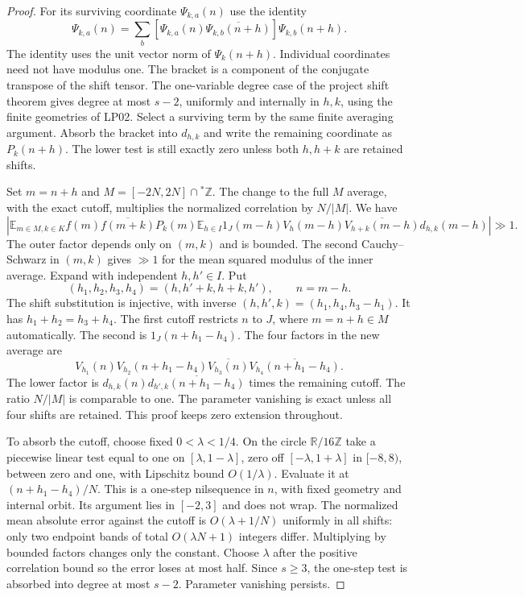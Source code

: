\documentclass[11pt]{article}
\newcommand{\E}{\mathbb E}
\newcommand{\Z}{\mathbb Z}
\begin{document}
\begin{proof}
For its surviving coordinate $\Psi_{k,a}(n)$ use the identity
\[
 \Psi_{k,a}(n)=\sum_b
 [\Psi_{k,a}(n)\overline{\Psi_{k,b}(n+h)}]\Psi_{k,b}(n+h).
\]
The identity uses the unit vector norm of $\Psi_k(n+h)$.
Individual coordinates need not have modulus one. The bracket
is a component of the conjugate transpose of the shift tensor.
The one-variable degree case of the project shift theorem gives
degree at most $s-2$, uniformly and internally in $h,k$, using the
finite geometries of LP02. Select a surviving term by the same
finite averaging argument. Absorb the bracket into $d_{h,k}$ and
write the remaining coordinate as $P_k(n+h)$. The lower test is
still exactly zero unless both $h,h+k$ are retained shifts.

Set $m=n+h$ and $M=[-2N,2N]\cap{}^*\Z$. The change to the
full $M$ average, with the exact cutoff, multiplies the
normalized correlation by $N/|M|$. We have
\[
 \left|\E_{m\in M,k\in K}
 f(m)\overline{f(m+k)}P_k(m)
 \E_{h\in I} 1_J(m-h)V_h(m-h)
 \overline{V_{h+k}(m-h)}d_{h,k}(m-h)\right|\gg1 .
\]
The outer factor depends only on $(m,k)$ and is bounded.
The second Cauchy--Schwarz in $(m,k)$ gives $\gg1$ for the
mean squared modulus of the inner average. Expand with independent
$h,h'\in I$. Put
\[
 (h_1,h_2,h_3,h_4)=(h,h'+k,h+k,h'),\qquad n=m-h.
\]
The shift substitution is injective, with inverse
$(h,h',k)=(h_1,h_4,h_3-h_1)$. It has $h_1+h_2=h_3+h_4$.
The first cutoff restricts $n$ to $J$, where $m=n+h\in M$
automatically. The second is $1_J(n+h_1-h_4)$. The four factors
in the new average are
\[
 V_{h_1}(n)V_{h_2}(n+h_1-h_4)
 \overline{V_{h_3}(n)}\overline{V_{h_4}(n+h_1-h_4)} .
\]
The lower factor is
$d_{h,k}(n)\overline{d_{h',k}(n+h_1-h_4)}$
times the remaining cutoff. The ratio $N/|M|$ is comparable
to one. The parameter vanishing is exact unless all four shifts
are retained. This proof keeps zero extension throughout.

To absorb the cutoff, choose fixed $0<\lambda<1/4$.
On the circle $\mathbb R/16\Z$ take a piecewise linear test
equal to one on $[\lambda,1-\lambda]$, zero off
$[-\lambda,1+\lambda]$ in $[-8,8)$, between zero and one,
with Lipschitz bound $O(1/\lambda)$. Evaluate it at
$(n+h_1-h_4)/N$. This is a one-step nilsequence in $n$,
with fixed geometry and internal orbit. Its argument lies in
$[-2,3]$ and does not wrap. The normalized mean absolute error
against the cutoff is $O(\lambda+1/N)$ uniformly in all shifts:
only two endpoint bands of total $O(\lambda N+1)$ integers
differ. Multiplying by bounded factors changes only the constant.
Choose $\lambda$ after the positive correlation bound so the
error loses at most half. Since $s\ge3$, the one-step test is
absorbed into degree at most $s-2$. Parameter vanishing persists.


\end{proof}
\end{document}
